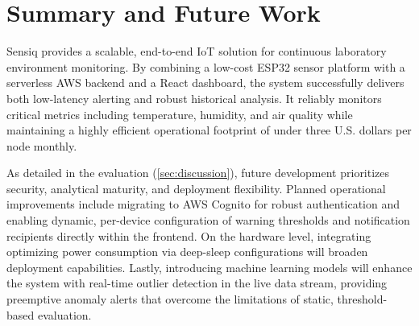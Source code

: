 \section{Summary and Future Work}\label{sec:summary}

Sensiq provides a scalable, end-to-end IoT solution for continuous laboratory environment monitoring.
By combining a low-cost ESP32 sensor platform with a serverless AWS backend and a React dashboard,
the system successfully delivers both low-latency alerting and robust historical analysis.
It reliably monitors critical metrics including temperature, humidity, and air quality while
maintaining a highly efficient operational footprint of under three U.S. dollars per node monthly.

As detailed in the evaluation (\cref{sec:discussion}), future development prioritizes security,
analytical maturity, and deployment flexibility. Planned operational improvements include
migrating to AWS Cognito for robust authentication and enabling dynamic, per-device configuration
of warning thresholds and notification recipients directly within the frontend.
On the hardware level, integrating optimizing power
consumption via deep-sleep configurations will broaden deployment capabilities.
Lastly, introducing machine learning models will enhance the system with real-time outlier
detection in the live data stream, providing preemptive anomaly alerts that overcome the limitations
of static, threshold-based evaluation.